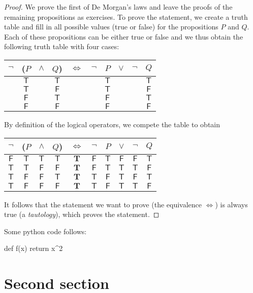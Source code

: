 \documentclass{tstextbook}
\begin{document}
\begin{proof}
  \newcommand{\T}{\mathsf{T}}
  \newcommand{\TT}{\mathbf{T}}
  \renewcommand{\F}{\mathsf{F}}
  We prove the first of De Morgan's laws and leave the proofs of
  the remaining propositions as exercises. To prove the statement,
  we create a truth table and fill in all possible values (true or
  false) for the propositions $P$ and $Q$. Each of these propositions
  can be either true or false and we thus obtain the following truth
  table with four cases:
  \begin{center}
    \begin{tabular}{cccccccccc}
      $\lnot$ & ($P$ & $\land$ & $Q$) & $\Leftrightarrow$ & $\lnot$ & $P$ & $\lor$ & $\lnot$ & $Q$ \\
      \midrule
      & $\T$ && $\T$ &&& $\T$ &&& $\T$ \\
      & $\T$ && $\F$ &&& $\T$ &&& $\F$ \\
      & $\F$ && $\T$ &&& $\F$ &&& $\T$ \\
      & $\F$ && $\F$ &&& $\F$ &&& $\F$
    \end{tabular}
  \end{center}
  By definition of the logical operators, we compete the table to obtain
  \begin{center}
    \begin{tabular}{cccccccccc}
      $\lnot$ & ($P$ & $\land$ & $Q$) & $\Leftrightarrow$ & $\lnot$ & $P$ & $\lor$ & $\lnot$ & $Q$ \\
      \midrule
      $\F$ & $\T$ & $\T$ & $\T$ & $\TT$ & $\F$ & $\T$ & $\F$ & $\F$& $\T$ \\
      $\T$ & $\T$ & $\F$ & $\F$ & $\TT$ & $\F$ & $\T$ & $\T$ & $\T$& $\F$ \\
      $\T$ & $\F$ & $\F$ & $\T$ & $\TT$ & $\T$ & $\F$ & $\T$ & $\F$& $\T$ \\
      $\T$ & $\F$ & $\F$ & $\F$ & $\TT$ & $\T$ & $\F$ & $\T$ & $\T$& $\F$
    \end{tabular}
  \end{center}
  It follows that the statement we want to prove (the equivalence $\Leftrightarrow$)
  is always true (a \emph{tautology}), which proves the statement.
\end{proof}

Some python code follows:

\begin{python}
def f(x)
    return x^2
\end{python}


\section{Second section}
\end{document}
